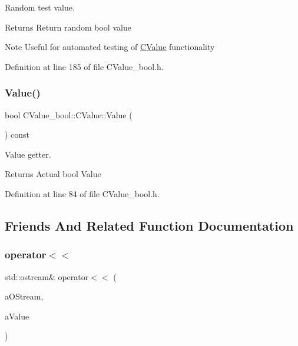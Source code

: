 Random test value. 

\begin{DoxyReturn}{Returns}
Return random {\ttfamily bool} value 
\end{DoxyReturn}
\begin{DoxyNote}{Note}
Useful for automated testing of \hyperlink{class_c_value__bool_1_1_c_value}{C\+Value} functionality 
\end{DoxyNote}


Definition at line 185 of file C\+Value\+\_\+bool.\+h.

\mbox{\label{class_c_value__bool_1_1_c_value_a78e9392ca4d446ed32a83ad5a89b075d}} 
\subsubsection{\texorpdfstring{Value()}{Value()}}
{\footnotesize\ttfamily bool C\+Value\+\_\+bool\+::\+C\+Value\+::\+Value (\begin{DoxyParamCaption}{ }\end{DoxyParamCaption}) const\hspace{0.3cm}{\ttfamily [inline]}}



Value getter. 

\begin{DoxyReturn}{Returns}
Actual {\ttfamily bool} {\ttfamily Value} 
\end{DoxyReturn}


Definition at line 84 of file C\+Value\+\_\+bool.\+h.



\subsection{Friends And Related Function Documentation}
\mbox{\label{class_c_value__bool_1_1_c_value_a3d28097fae6bdd5a8146d9ab90f8b62f}} 
\subsubsection{\texorpdfstring{operator$<$$<$}{operator<<}}
{\footnotesize\ttfamily std\+::ostream\& operator$<$$<$ (\begin{DoxyParamCaption}\item[{std\+::ostream \&}]{a\+O\+Stream,  }\item[{const \hyperlink{class_c_value__bool_1_1_c_value}{C\+Value} \&}]{a\+Value }\end{DoxyParamCaption})\hspace{0.3cm}{\ttfamily [friend]}}



